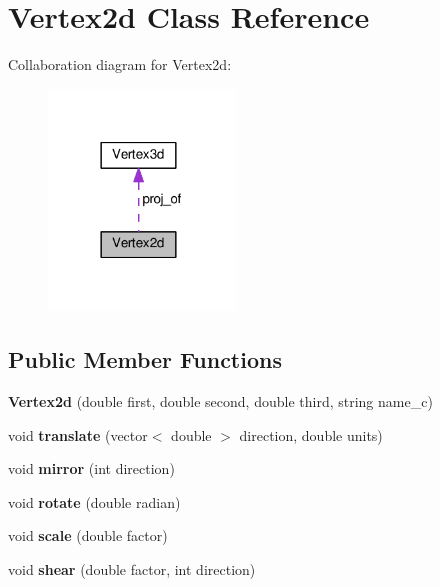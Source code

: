 \hypertarget{classVertex2d}{}\section{Vertex2d Class Reference}
\label{classVertex2d}


Collaboration diagram for Vertex2d\+:
\nopagebreak
\begin{figure}[H]
\begin{center}
\leavevmode
\includegraphics[width=141pt]{classVertex2d__coll__graph}
\end{center}
\end{figure}
\subsection*{Public Member Functions}
\begin{DoxyCompactItemize}
\item 
{\bfseries Vertex2d} (double first, double second, double third, string name\+\_\+c)\hypertarget{classVertex2d_afaf4e06289fec9a7a1703c506d7c9e4b}{}\label{classVertex2d_afaf4e06289fec9a7a1703c506d7c9e4b}

\item 
void {\bfseries translate} (vector$<$ double $>$ direction, double units)\hypertarget{classVertex2d_a2abdd1c5f5d7e3d694392d69f40985e8}{}\label{classVertex2d_a2abdd1c5f5d7e3d694392d69f40985e8}

\item 
void {\bfseries mirror} (int direction)\hypertarget{classVertex2d_a2cd4c427a421be1cd1a3c9e79eaa1740}{}\label{classVertex2d_a2cd4c427a421be1cd1a3c9e79eaa1740}

\item 
void {\bfseries rotate} (double radian)\hypertarget{classVertex2d_a6d209eaee9de2c31ffdf95206edbf87e}{}\label{classVertex2d_a6d209eaee9de2c31ffdf95206edbf87e}

\item 
void {\bfseries scale} (double factor)\hypertarget{classVertex2d_a2edde5b93bb3e622c6a0c1402b04231e}{}\label{classVertex2d_a2edde5b93bb3e622c6a0c1402b04231e}

\item 
void {\bfseries shear} (double factor, int direction)\hypertarget{classVertex2d_abb756cd32c744ea52466a8e80bbf9807}{}\label{classVertex2d_abb756cd32c744ea52466a8e80bbf9807}

\end{DoxyCompactItemize}
